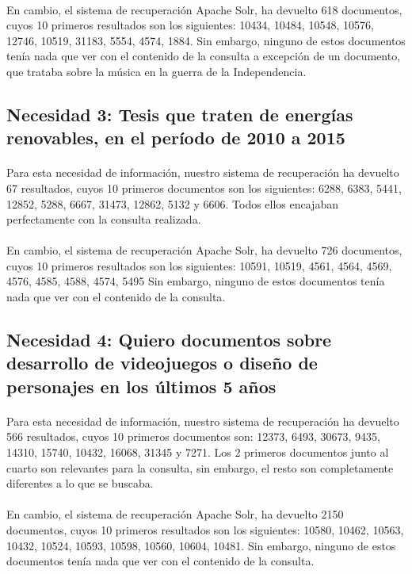 \documentclass[a4paper]{article}
\begin{document}
\paragraph{}En cambio, el sistema de recuperación Apache Solr, ha devuelto 618 documentos, cuyos 10 primeros resultados son los siguientes: 10434, 10484, 10548, 10576, 12746, 10519, 31183, 5554, 4574, 1884. Sin embargo, ninguno de estos documentos tenía nada que ver con el contenido de la consulta a excepción de un documento, que trataba sobre la música en la guerra de la Independencia.
\subsection{Necesidad 3: Tesis que traten de energías renovables, en el período de 2010 a 2015}
\paragraph{}Para esta necesidad de información, nuestro sistema de recuperación ha devuelto 67 resultados, cuyos 10 primeros documentos son los siguientes: 6288, 6383, 5441, 12852, 5288, 6667, 31473, 12862, 5132 y 6606. Todos ellos encajaban perfectamente con la consulta realizada.
\paragraph{}En cambio, el sistema de recuperación Apache Solr, ha devuelto 726 documentos, cuyos 10 primeros resultados son los siguientes: 10591, 10519, 4561, 4564, 4569, 4576, 4585, 4588, 4574, 5495 Sin embargo, ninguno de estos documentos tenía nada que ver con el contenido de la consulta.
\subsection{Necesidad 4: Quiero documentos sobre desarrollo de videojuegos o diseño de personajes en los últimos 5 años}
\paragraph{}Para esta necesidad de información, nuestro sistema de recuperación ha devuelto 566 resultados, cuyos 10 primeros documentos son: 12373, 6493, 30673, 9435, 14310, 15740, 10432, 16068, 31345 y 7271. Los 2 primeros documentos junto al cuarto son relevantes para la consulta, sin embargo, el resto son completamente diferentes a lo que se buscaba.
\paragraph{}En cambio, el sistema de recuperación Apache Solr, ha devuelto 2150 documentos, cuyos 10 primeros resultados son los siguientes: 10580, 10462, 10563, 10432, 10524, 10593, 10598, 10560, 10604, 10481. Sin embargo, ninguno de estos documentos tenía nada que ver con el contenido de la consulta.
\end{document}
